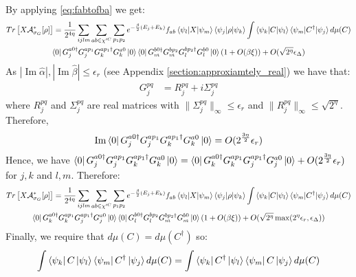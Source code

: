 \documentclass[aps,floatfix,10pt,amssymb,amsfont,amsmath,superscriptaddress,float,nofootinbib,longbibliography,nobalancelastpage,twocolumn]{revtex4-2}
\begin{document}
\begin{widetext}
\begin{multline}
\end{multline}
By applying \eqref{eq:fabtofba} we get:
\begin{multline}
    Tr\left[X\mathcal{A}^*_{\sigma_G}[\rho]\right] =\frac{1}{2^{4\eta}} \sum_{ijlm} \sum_{ab\in \chi'^C}\sum_{p_1p_2} e^{-\frac{\beta}{2}(E_j+E_k)}f_{ab} \braket{\psi_l|X|\psi_m}\braket{\psi_j|\rho|\psi_k} \int \braket{\psi_k|C|\psi_l}\braket{\psi_m|C^{\dagger}|\psi_j} d\mu(C)\\ \bra{0} G^{a0\dagger}_jG^{ap_1}_jG^{ap_1\dagger}_kG^{a0}_k\ket{0}
    \bra{0}G_m^{b0\dagger}G_m^{bp_2}G_l^{bp_2\dagger}G_l^{b0}\ket{0}(1+O(\beta\xi))+ O(\sqrt{2^{\eta}}\epsilon_\Delta)
\end{multline}
As $|\operatorname{Im}\hat \alpha|,|\operatorname{Im}\hat \beta| \leq \epsilon_r$ (see Appendix \ref{section:approxiamtely_real}) we have that:
\begin{align}
    G^{pq}_j &= R^{pq}_j + i\Sigma_j^{pq}
\end{align}
where $R^{pq}_j$ and $\Sigma_j^{pq}$ are real matrices with $\|\Sigma^{pq}_j\|_{\infty} \leq \epsilon_r$ and $\|R^{pq}_j\|_{\infty} \leq \sqrt{2^{\eta}}$. Therefore, 
\begin{equation}
\label{eq:G_im}
    \operatorname{Im}\bra{0} G^{a0\dagger}_jG^{ap_1}_jG^{ap_1\dagger}_kG^{a0}_k\ket{0} = O(2^{\frac{3\eta}{2}}\epsilon_r)
\end{equation}
 Hence, we have $\bra{0} G^{a0\dagger}_jG^{ap_1}_jG^{ap_1\dagger}_kG^{a0}_k\ket{0} = \bra{0} G^{a0\dagger}_kG^{ap_1}_kG^{ap_1\dagger}_jG^{a0}_j\ket{0} + O(2^{\frac{3\eta}{2}}\epsilon_r)$ for $j,k$ and $l,m$.
Therefore:
\begin{multline}
    Tr\left[X\mathcal{A}^*_{\sigma_G}[\rho]\right] =\frac{1}{2^{4\eta}} \sum_{ijlm} \sum_{ab\in \chi'^C}\sum_{p_1p_2} e^{-\frac{\beta}{2}(E_j+E_k)}f_{ab} \braket{\psi_l|X|\psi_m}\braket{\psi_j|\rho|\psi_k} \int \braket{\psi_k|C|\psi_l}\braket{\psi_m|C^{\dagger}|\psi_j} d\mu(C)\\ \bra{0} G^{a0\dagger}_kG^{ap_1}_kG^{ap_1\dagger}_jG^{a0}_j\ket{0}
    \bra{0}G_l^{b0\dagger}G_l^{bp_2}G_m^{bp_2\dagger}G_m^{b0}\ket{0}(1+O(\beta\xi))+ O(\sqrt{2^{\eta}}\max(2^{\eta}\epsilon_r,\epsilon_\Delta))
\end{multline}
Finally, we require that $d\mu(C) = d\mu(C^{\dagger})$ so:
\begin{equation}
    \int  \bra{\psi_k}C\ket{\psi_{l}}\bra{\psi_m}C^{\dagger} \ket{\psi_j} d\mu(C) = \int  \bra{\psi_k}C^{\dagger}\ket{\psi_{l}}\bra{\psi_m}C \ket{\psi_j} d\mu(C)
\end{equation}

\end{widetext}
\end{document}
